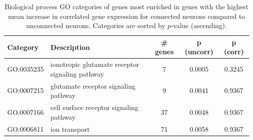 \documentclass[10pt,letterpaper]{article}
\begin{document}
{\begin{table}[]
\begin{adjustwidth}{-2.25in}{}
\centering
\caption{Biological process GO categories of genes most enriched in genes with the highest mean increase in correlated gene expression for connected neurons compared to unconnected neurons.
Categories are sorted by $p$-value (ascending).}
\label{tab:enrichmentCON}
\begin{tabular}{llccc}

\hline
\textbf{Category} & \textbf{Description} & \textbf{\# genes} & \textbf{p (uncorr)}                                                                                                                                        & \textbf{p (corr)} \\ \hline                                                                                                                                         %
GO:0035235          & ionotropic glutamate receptor signaling pathway & 7                                                      & 0.0005                                                & 0.3245                                             \\
GO:0007215          & glutamate receptor signaling pathway                                                       & 9                                                      & 0.0041                                                & 0.9367                                             \\
GO:0007166          & cell surface receptor signaling pathway                                                    & 37                                                     & 0.0048                                                & 0.9367                                             \\
GO:0006811          & ion transport                                                                              & 71                                                     & 0.0058                                                & 0.9367                                             \\

\end{tabular}
\end{adjustwidth}
\end{table}}
\end{document}

